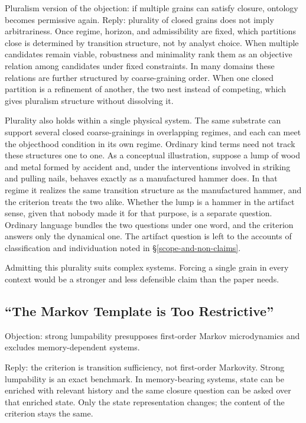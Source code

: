 Pluralism version of the objection: if multiple grains can satisfy
closure, ontology becomes permissive again. Reply: plurality of closed
grains does not imply arbitrariness. Once regime, horizon, and
admissibility are fixed, which partitions close is determined by
transition structure, not by analyst choice. When multiple candidates
remain viable, robustness and minimality rank them as an objective
relation among candidates under fixed constraints. In many domains these
relations are further structured by coarse-graining order. When one
closed partition is a refinement of another, the two nest instead of
competing, which gives pluralism structure without dissolving it.

Plurality also holds within a single physical system. The same substrate
can support several closed coarse-grainings in overlapping regimes, and
each can meet the objecthood condition in its own regime. Ordinary kind
terms need not track these structures one to one. As a conceptual
illustration, suppose a lump of wood and metal formed by accident and,
under the interventions involved in striking and pulling nails, behaves
exactly as a manufactured hammer does. In that regime it realizes the
same transition structure as the manufactured hammer, and the criterion
treats the two alike. Whether the lump is a hammer in the artifact
sense, given that nobody made it for that purpose, is a separate
question. Ordinary language bundles the two questions under one word,
and the criterion answers only the dynamical one. The artifact question
is left to the accounts of classification and individuation noted in
\S\ref{scope-and-non-claims}.

Admitting this plurality suits complex systems. Forcing a single grain
in every context would be a stronger and less defensible claim than the
paper needs.

\subsection{``The Markov Template is Too
	Restrictive''}\label{the-markov-template-is-too-restrictive}

Objection: strong lumpability presupposes first-order Markov
microdynamics and excludes memory-dependent systems.

Reply: the criterion is transition sufficiency, not first-order
Markovity. Strong lumpability is an exact benchmark. In memory-bearing
systems, state can be enriched with relevant history and the same
closure question can be asked over that enriched state. Only the state
representation changes; the content of the criterion stays the same.

